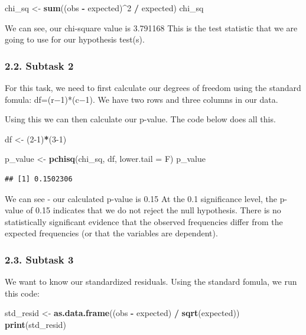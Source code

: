 \documentclass[
]{article}
\newenvironment{Shaded}{\begin{snugshade}}{\end{snugshade}}
\newcommand{\AttributeTok}[1]{\textcolor[rgb]{0.13,0.29,0.53}{#1}}
\newcommand{\DecValTok}[1]{\textcolor[rgb]{0.00,0.00,0.81}{#1}}
\newcommand{\FunctionTok}[1]{\textcolor[rgb]{0.13,0.29,0.53}{\textbf{#1}}}
\newcommand{\NormalTok}[1]{#1}
\newcommand{\OtherTok}[1]{\textcolor[rgb]{0.56,0.35,0.01}{#1}}
\newcommand{\SpecialCharTok}[1]{\textcolor[rgb]{0.81,0.36,0.00}{\textbf{#1}}}
\begin{document}
\begin{Shaded}
\begin{Highlighting}[]
\NormalTok{chi\_sq }\OtherTok{\textless{}{-}} \FunctionTok{sum}\NormalTok{((obs }\SpecialCharTok{{-}}\NormalTok{ expected)}\SpecialCharTok{\^{}}\DecValTok{2} \SpecialCharTok{/}\NormalTok{ expected)}
\NormalTok{chi\_sq}
\end{Highlighting}
\end{Shaded}
We can see, our chi-square value is 3.791168\newline
This is the test statistic that we are going to use for our hypothesis test(s).\newline


\subsubsection{2.2. Subtask 2}\label{Subtask-2-Question-1}
For this task, we need to first calculate our degrees of freedom using the standard fomula: df=(r−1)*(c−1). We have two rows and three columns in our data.

Using this we can then calculate our p-value. The code below does all this.  
\begin{Shaded}
\begin{Highlighting}[]
\NormalTok{df }\OtherTok{\textless{}{-}}\NormalTok{ (}\DecValTok{2{-}1}\NormalTok{)}\SpecialCharTok{*}\NormalTok{(}\DecValTok{3{-}1}\NormalTok{)}

\NormalTok{p\_value }\OtherTok{\textless{}{-}} \FunctionTok{pchisq}\NormalTok{(chi\_sq, df, }\AttributeTok{lower.tail =}\NormalTok{ F)}
\NormalTok{p\_value}
\end{Highlighting}
\end{Shaded}
\begin{verbatim}
## [1] 0.1502306
\end{verbatim}
We can see - our calculated p-value is 0.15\newline
At the 0.1 significance level, the p-value of 0.15 indicates that we do not reject the null hypothesis. There is no statistically significant evidence that the observed frequencies differ from the expected frequencies (or that the variables are dependent).\newline


\subsubsection{2.3. Subtask 3}\label{Subtask-3-Question-1}
We want to know our standardized residuals. Using the standard fomula, we run this code:
\begin{Shaded}
\begin{Highlighting}[]
\NormalTok{std\_resid }\OtherTok{\textless{}{-}} \FunctionTok{as.data.frame}\NormalTok{((obs }\SpecialCharTok{{-}}\NormalTok{ expected) }\SpecialCharTok{/} \FunctionTok{sqrt}\NormalTok{(expected))}
\FunctionTok{print}\NormalTok{(std\_resid)}
\end{Highlighting}
\end{Shaded}
\end{document}
